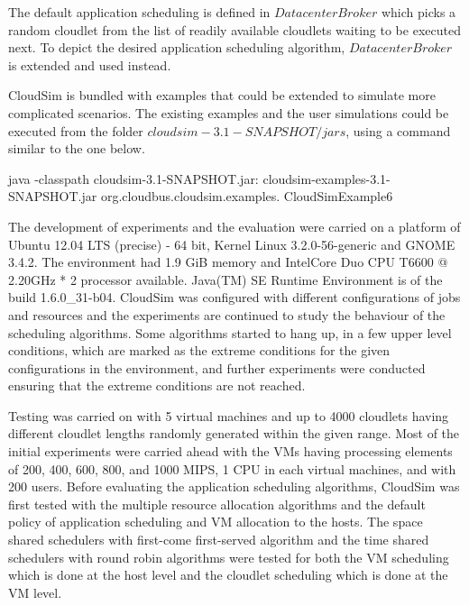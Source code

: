 \documentclass[times, 10pt,twocolumn]{article}
\begin{document}
The default application scheduling is defined in $DatacenterBroker$ which picks a random cloudlet from the list of readily available cloudlets waiting to be executed next. To depict the desired application scheduling algorithm, $DatacenterBroker$ is extended and used instead.

CloudSim is bundled with examples that could be extended to simulate more complicated scenarios. The existing examples and the user simulations could be executed from the folder $cloudsim-3.1-SNAPSHOT/jars$, using a command similar to the one below.
\begin{verbatimtab}
java -classpath
    cloudsim-3.1-SNAPSHOT.jar:
    cloudsim-examples-3.1-SNAPSHOT.jar 
    org.cloudbus.cloudsim.examples.
    CloudSimExample6
\end{verbatimtab}

The development of experiments and the evaluation were carried on a platform of Ubuntu 12.04 LTS (precise) - 64 bit, Kernel Linux 3.2.0-56-generic and GNOME 3.4.2. The environment had 1.9 GiB memory and Intel\textregistered Core Duo CPU T6600 @ 2.20GHz * 2 processor available. Java(TM) SE Runtime Environment is of the build 1.6.0\_31-b04.
CloudSim was configured with different configurations of jobs and resources and the experiments are continued to study the behaviour of the scheduling algorithms. Some algorithms started to hang up, in a few upper level conditions, which are marked as the extreme conditions for the given configurations in the environment, and further experiments were conducted ensuring that the extreme conditions are not reached. 

Testing was carried on with 5 virtual machines and up to 4000 cloudlets having different cloudlet lengths randomly generated within the given range. Most of the initial experiments were carried ahead with the VMs having processing elements of 200, 400, 600, 800, and 1000 MIPS, 1 CPU in each virtual machines, and with 200 users.
Before evaluating the application scheduling algorithms, CloudSim was first tested with the multiple resource allocation algorithms and the default policy of application scheduling and VM allocation to the hosts. The space shared schedulers with first-come first-served algorithm and the time shared schedulers with round robin algorithms were tested for both the VM scheduling which is done at the host level and the cloudlet scheduling which is done at the VM level. 
\end{document}
